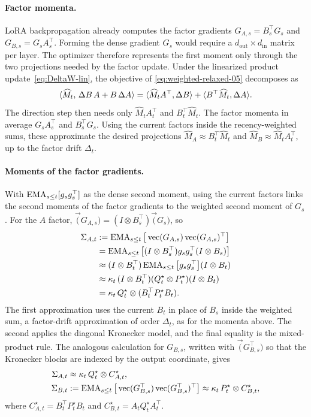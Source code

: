 \paragraph{Factor momenta.}
LoRA backpropagation already computes the factor gradients
$G_{A,s}=B_s^\top G_s$ and $G_{B,s}=G_sA_s^\top$. Forming the dense
gradient $G_s$ would require a $d_{\mathrm{out}}\times d_{\mathrm{in}}$
matrix per layer. The optimizer therefore represents the first moment only
through the two projections needed by the factor update. Under the
linearized product update~\eqref{eq:DeltaW-lin}, the objective of
\eqref{eq:weighted-relaxed-05} decomposes as
\[
  \langle \widehat M_t,\,\Delta B\,A+B\,\Delta A \rangle
  =
  \langle \widehat M_tA^\top,\Delta B \rangle
  +
  \langle B^\top\widehat M_t,\Delta A \rangle.
\]
The direction step then needs only $\widehat M_tA_t^\top$ and
$B_t^\top\widehat M_t$. The factor momenta in  average
$G_sA_s^\top$ and $B_s^\top G_s$. Using the current factors inside the
recency-weighted sums, these approximate the desired projections
$\widehat M_A\approx B_t^\top\widehat M_t$ and
$\widehat M_B\approx \widehat M_tA_t^\top$, up to the factor drift $\Delta_t$.

\paragraph{Moments of the factor gradients.}
With $\operatorname{EMA}_{s\le t}[g_sg_s^\top]$ as the dense second moment, using the
current factors links the second moments of the factor gradients to
the weighted second moment of $G_s$. For the $A$ factor,
$\vec(G_{A,s})=(I\otimes B_s^\top)\vec(G_s)$, so
\begin{align*}
 \Sigma_{A,t}
 &:= \operatorname{EMA}_{s\le t}\big[\operatorname{vec}(G_{A,s})\operatorname{vec}(G_{A,s})^\top\big] \\
 &= \operatorname{EMA}_{s\le t}\big[
      (I\otimes B_s^\top)g_sg_s^\top(I\otimes B_s)
    \big] \\
 &\approx
    (I\otimes B_t^\top)
    \operatorname{EMA}_{s\le t}\big[g_sg_s^\top\big]
    (I\otimes B_t) \\
 &\approx
    \kappa_t\,(I\otimes B_t^\top)
    (Q^\star_t\otimes P^\star_t)
    (I\otimes B_t) \\
 &= \kappa_t\,Q^\star_t\otimes(B_t^\top P^\star_tB_t).
\end{align*}
The first approximation uses the current $B_t$ in place of $B_s$ inside the
weighted sum, a factor-drift approximation of order $\Delta_t$, as for the
momenta above. The second applies the
diagonal Kronecker model, and the final equality is the mixed-product rule. The analogous calculation for $G_{B,s}$, written with
$\vec(G_{B,s}^\top)$ so that the Kronecker blocks are indexed by the output
coordinate, gives
\begin{align}
  \Sigma_{A,t}
    &\approx \kappa_t\,Q^\star_t\otimes C^\star_{A,t},
  \nonumber \\
  \Sigma_{B,t}
    &:= \operatorname{EMA}_{s\le t}\big[
      \operatorname{vec}(G_{B,s}^\top)\operatorname{vec}(G_{B,s}^\top)^\top
    \big]
    \approx \kappa_t\,P^\star_t\otimes C^\star_{B,t},
  \label{eq:observable-moments-05}
\end{align}
where
$C^\star_{A,t}=B_t^\top P^\star_tB_t$ and
$C^\star_{B,t}=A_tQ^\star_tA_t^\top$.


